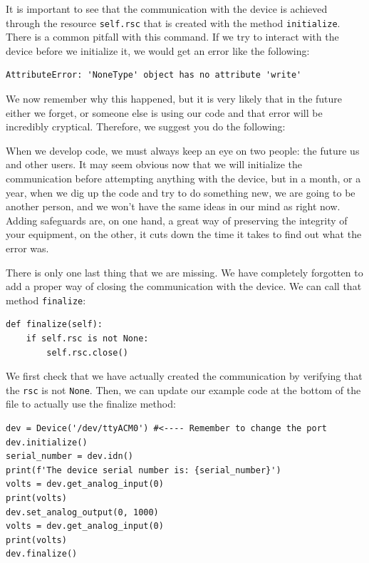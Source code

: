 It is important to see that the communication with the device is achieved through the resource \texttt{self.rsc} that is created with the method \texttt{initialize}. There is a common pitfall with this command. If we try to interact with the device before we initialize it, we would get an error like the following:

\begin{verbatim}
AttributeError: 'NoneType' object has no attribute 'write'
\end{verbatim}

We now remember why this happened, but it is very likely that in the future either we forget, or someone else is using our code and that error will be incredibly cryptical. Therefore, we suggest you do the following:


When we develop code, we must always keep an eye on two people: the future us and other users. It may seem obvious now that we will initialize the communication before attempting anything with the device, but in a month, or a year, when we dig up the code and try to do something new, we are going to be another person, and we won't have the same ideas in our mind as right now. Adding safeguards are, on one hand, a great way of preserving the integrity of your equipment, on the other, it cuts down the time it takes to find out what the error was.

There is only one last thing that we are missing. We have completely forgotten to add a proper way of closing the communication with the device. We can call that method \texttt{finalize}:

\begin{verbatim}
def finalize(self):
    if self.rsc is not None:
        self.rsc.close()
\end{verbatim}

We first check that we have actually created the communication by verifying that the \texttt{rsc} is not \texttt{None}. Then, we can update our example code at the bottom of the file to actually use the finalize method:

\begin{verbatim}
dev = Device('/dev/ttyACM0') #<---- Remember to change the port
dev.initialize()
serial_number = dev.idn()
print(f'The device serial number is: {serial_number}')
volts = dev.get_analog_input(0)
print(volts)
dev.set_analog_output(0, 1000)
volts = dev.get_analog_input(0)
print(volts)
dev.finalize()
\end{verbatim}

